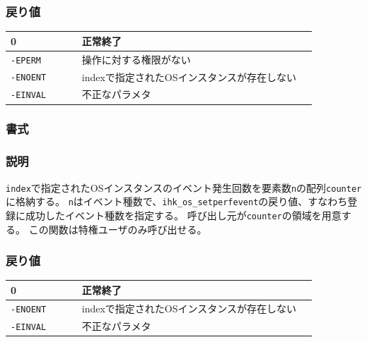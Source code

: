 \documentclass[twoside,11pt,fleqn]{book}
\begin{document}
\subsubsection*{戻り値}{\quad}
\begin{table}[!h]
\footnotesize
\begin{tabular}{|p{0.20\linewidth}|p{0.66\linewidth}|} \hline
0&正常終了\\ \hline
\texttt{-EPERM}&操作に対する権限がない\\ \hline
\texttt{-ENOENT} &indexで指定されたOSインスタンスが存在しない\\ \hline
\texttt{-EINVAL}&不正なパラメタ\\ \hline
\end{tabular}
\vspace{-0em}
\end{table}
\FloatBarrier

\subsubsection{}
\subsubsection*{書式}{\quad} 
\subsubsection*{説明}{\quad} 
\texttt{index}で指定されたOSインスタンスのイベント発生回数を要素数\texttt{n}の配列\texttt{counter}に格納する。
\texttt{n}はイベント種数で、\texttt{ihk\_os\_setperfevent}の戻り値、すなわち登録に成功したイベント種数を指定する。
呼び出し元が\texttt{counter}の領域を用意する。
この関数は特権ユーザのみ呼び出せる。

\subsubsection*{戻り値}{\quad}
\begin{table}[!h]
\footnotesize
\begin{tabular}{|p{0.20\linewidth}|p{0.66\linewidth}|} \hline
0&正常終了\\ \hline
\texttt{-ENOENT}&indexで指定されたOSインスタンスが存在しない\\ \hline
\texttt{-EINVAL}&不正なパラメタ\\ \hline
\end{tabular}
\vspace{-0em}
\end{table}
\FloatBarrier
\end{document}
